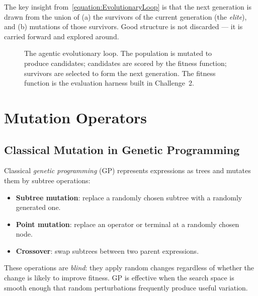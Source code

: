 The key insight from~\eqref{equation:EvolutionaryLoop} is that the next generation is drawn from the union of (a) the survivors of the current generation (the \emph{elite}), and (b) mutations of those survivors.
Good structure is not discarded — it is carried forward and explored around.

\begin{figure}[htb!]
\begin{center}
\caption{The agentic evolutionary loop.
The population is mutated to produce candidates; candidates are scored by the fitness function; survivors are selected to form the next generation.
The fitness function is the evaluation harness built in Challenge~2.}
\label{figure:EvolutionaryLoop}
\end{center}
\end{figure}

\section{Mutation Operators}
\label{section:MutationOperators}

\subsection{Classical Mutation in Genetic Programming}

Classical \emph{genetic programming} (GP) represents expressions as trees and mutates them by subtree operations:
\begin{itemize}
\item \textbf{Subtree mutation}: replace a randomly chosen subtree with a randomly generated one.
\item \textbf{Point mutation}: replace an operator or terminal at a randomly chosen node.
\item \textbf{Crossover}: swap subtrees between two parent expressions.
\end{itemize}
These operations are \emph{blind}: they apply random changes regardless of whether the change is likely to improve fitness.
GP is effective when the search space is smooth enough that random perturbations frequently produce useful variation.

